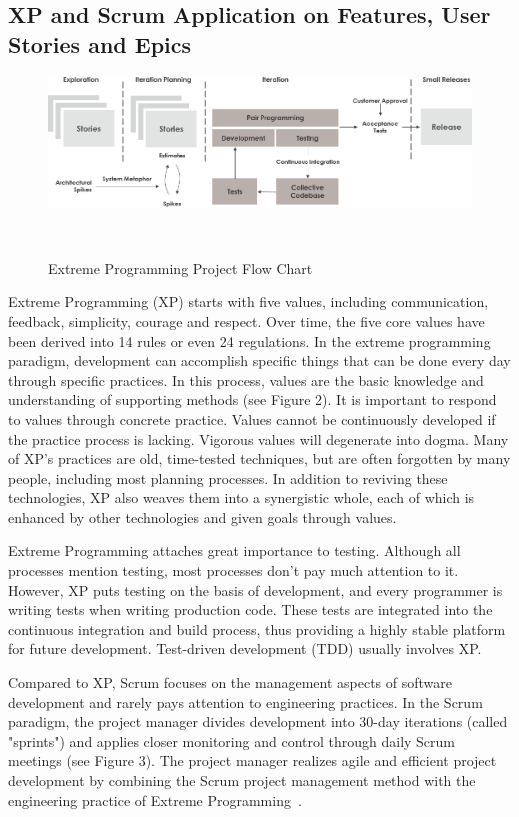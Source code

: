 \documentclass{sigchi}
\begin{document}
\subsection{XP and Scrum Application on Features, User Stories and Epics}

\begin{figure}
\centering
  \includegraphics[width=0.9\columnwidth]{figures/xp}
  \caption{Extreme Programming Project Flow Chart }~\label{fig:figure1}
\end{figure}

Extreme Programming (XP) starts with five values, including communication, feedback, simplicity, courage and respect. Over time, the five core values have been derived into 14 rules or even 24 regulations. In the extreme programming paradigm, development can accomplish specific things that can be done every day through specific practices. In this process, values are the basic knowledge and understanding of supporting methods (see Figure 2). It is important to respond to values through concrete practice. Values cannot be continuously developed if the practice process is lacking. Vigorous values will degenerate into dogma. Many of XP's practices are old, time-tested techniques, but are often forgotten by many people, including most planning processes. In addition to reviving these technologies, XP also weaves them into a synergistic whole, each of which is enhanced by other technologies and given goals through values.

Extreme Programming attaches great importance to testing. Although all processes mention testing, most processes don't pay much attention to it. However, XP puts testing on the basis of development, and every programmer is writing tests when writing production code. These tests are integrated into the continuous integration and build process, thus providing a highly stable platform for future development. Test-driven development (TDD) usually involves XP.

Compared to XP, Scrum focuses on the management aspects of software development and rarely pays attention to engineering practices. In the Scrum paradigm, the project manager divides development into 30-day iterations (called "sprints") and applies closer monitoring and control through daily Scrum meetings (see Figure 3). The project manager realizes agile and efficient project development by combining the Scrum project management method with the engineering practice of Extreme Programming~\cite{fowler_new_2001}.
\end{document}
